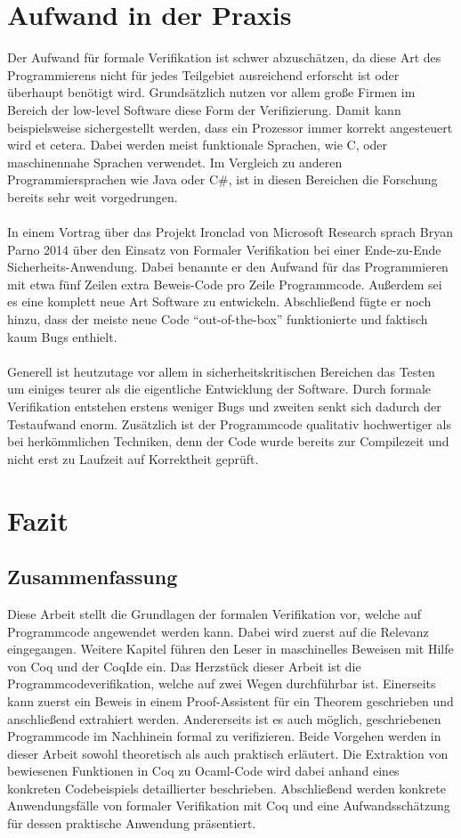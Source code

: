 \section{Aufwand in der Praxis}
Der Aufwand für formale Verifikation ist schwer abzuschätzen, da diese Art des Programmierens nicht für jedes Teilgebiet ausreichend erforscht ist oder überhaupt benötigt wird. Grundsätzlich nutzen vor allem große Firmen im Bereich der low-level Software diese Form der Verifizierung. Damit kann beispielsweise sichergestellt werden, dass ein Prozessor immer korrekt angesteuert wird et cetera. Dabei werden meist funktionale Sprachen, wie C, oder maschinennahe Sprachen verwendet. Im
Vergleich zu anderen Programmiersprachen wie Java oder C\#, ist in diesen Bereichen die Forschung bereits sehr weit vorgedrungen.\\
\\
In einem Vortrag über das Projekt Ironclad von Microsoft Research sprach Bryan Parno 2014 über den Einsatz von Formaler Verifikation bei einer Ende-zu-Ende Sicherheits-Anwendung. Dabei benannte er den Aufwand für das Programmieren mit etwa fünf Zeilen extra Beweis-Code pro Zeile Programmcode. Außerdem sei es eine komplett neue Art Software zu entwickeln. Abschließend fügte er noch hinzu, dass der meiste neue Code "`out-of-the-box"' funktionierte und faktisch kaum Bugs enthielt.\cite{IRONCLAD01:FV}\\
\\
Generell ist heutzutage vor allem in sicherheitskritischen Bereichen das Testen um einiges teurer als die eigentliche Entwicklung der Software. Durch formale Verifikation entstehen erstens weniger Bugs und zweiten senkt sich dadurch der Testaufwand enorm. Zusätzlich ist der Programmcode qualitativ hochwertiger als bei herkömmlichen Techniken, denn der Code wurde bereits zur Compilezeit und nicht erst zu Laufzeit auf Korrektheit geprüft.

\section{Fazit}

\subsection{Zusammenfassung}
Diese Arbeit stellt die Grundlagen der formalen Verifikation vor, welche auf Programmcode angewendet werden kann. Dabei wird zuerst auf die Relevanz eingegangen. Weitere Kapitel führen den Leser in maschinelles Beweisen mit Hilfe von Coq und der CoqIde ein. Das Herzstück dieser Arbeit ist die Programmcodeverifikation, welche auf zwei Wegen durchführbar ist. Einerseits kann zuerst ein Beweis in einem Proof-Assistent für ein Theorem geschrieben und anschließend extrahiert werden. Andererseits ist es auch möglich, geschriebenen Programmcode im Nachhinein formal zu verifizieren. Beide Vorgehen werden in dieser Arbeit sowohl theoretisch als auch praktisch erläutert. Die Extraktion von bewiesenen Funktionen in Coq zu Ocaml-Code wird dabei anhand eines konkreten Codebeispiels detaillierter beschrieben. Abschließend werden konkrete Anwendungsfälle von formaler Verifikation mit Coq und eine Aufwandsschätzung für dessen praktische Anwendung präsentiert.

